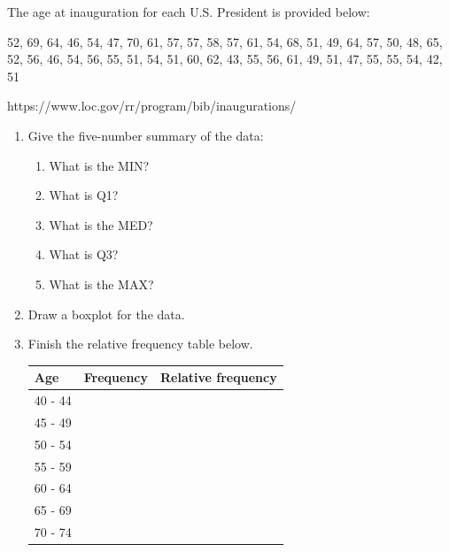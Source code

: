 \documentclass[11pt, chapterprefix=true]{scrbook}\usepackage[]{graphicx}\usepackage[]{color}
\begin{document}
\begin{exercises}
\begin{exercise}
\begin{center}
\end{center}

The age at inauguration for each U.S. President is provided below:

52, 69, 64, 46, 54, 47, 70, 61, 57, 57, 58, 57, 61, 54, 68, 51, 49, 64, 57, 50, 48, 65, 52, 56, 46, 54, 56, 55, 51, 54, 51, 60, 62, 43, 55, 56, 61, 49, 51, 47, 55, 55, 54, 42, 51

https://www.loc.gov/rr/program/bib/inaugurations/


\begin{enumerate}
  \item Give the five-number summary of the data:
  {\small{
    \begin{enumerate}
    \item What is the MIN?
    \item What is Q1?
    \item What is the MED?
    \item What is Q3?
    \item What is the MAX?
    \end{enumerate}
  }}
    \item Draw a boxplot for the data.
    \item Finish the relative frequency table below. 

{\small{
\begin{tabular}{@{} lcc @{}} \hline
Age & Frequency & Relative frequency \\ \hline
40 - 44 & & \\                        
45 - 49 & & \\                       
50 - 54 & & \\                      
55 - 59 & & \\                      
60 - 64 & & \\                    
65 - 69 & & \\  
70 - 74 & & \\
\end{tabular}
}}
    

\end{enumerate}
\end{exercise}
\end{exercises}
\end{document}
